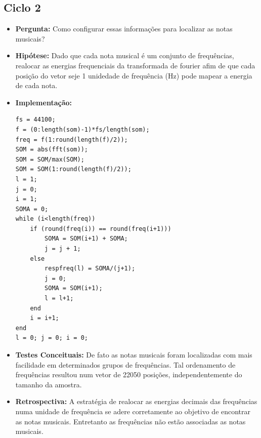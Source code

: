\subsection{Ciclo 2}
\label{subsec:ciclo_2}
\begin{itemize}
\item \textbf{Pergunta:} Como configurar essas informações para localizar as notas musicais?
\item \textbf{Hipótese:} Dado que cada nota musical é um conjunto de frequências, realocar as energias frequenciais da transformada de fourier afim de que cada posição do vetor seje 1 unidedade de frequência (Hz) pode mapear a energia de cada nota.
\item \textbf{Implementação:} 
\begin{lstlisting}
fs = 44100;
f = (0:length(som)-1)*fs/length(som);
freq = f(1:round(length(f)/2));
SOM = abs(fft(som));
SOM = SOM/max(SOM);
SOM = SOM(1:round(length(f)/2));
l = 1;
j = 0;
i = 1;
SOMA = 0; 
while (i<length(freq))
    if (round(freq(i)) == round(freq(i+1)))
        SOMA = SOM(i+1) + SOMA;
        j = j + 1;
    else
        respfreq(l) = SOMA/(j+1);
        j = 0;
        SOMA = SOM(i+1);
        l = l+1;
    end
    i = i+1;
end
l = 0; j = 0; i = 0;
\end{lstlisting}
\item \textbf{Testes Conceituais:} De fato as notas musicais foram localizadas com mais facilidade em determinados grupos de frequências. Tal ordenamento de frequências resultou num vetor de 22050 posições, independentemente do tamanho da amostra.
\item \textbf{Retrospectiva:} A estratégia de realocar as energias decimais das frequências numa unidade de frequência se adere corretamente ao objetivo de encontrar as notas musicais. Entretanto as frequências não estão associadas as notas musicais.
\end{itemize}

